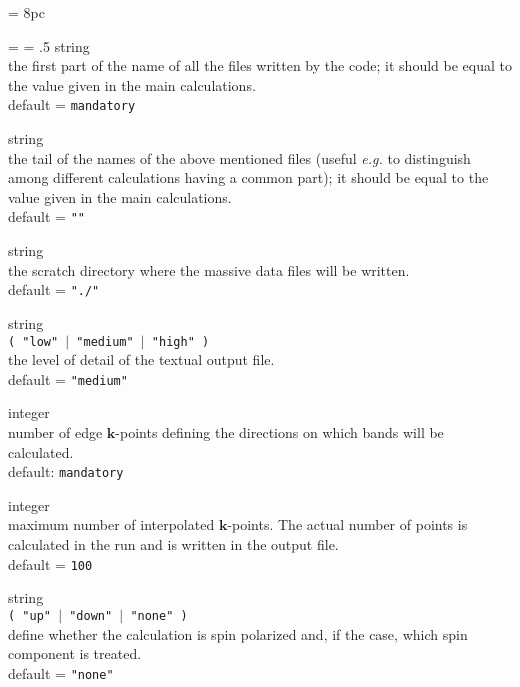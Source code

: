 \newdimen\descindent \descindent = 8pc
{\noindent \leftskip = \descindent \parskip = .5\baselineskip
{}%
{\sc string} \\ the first part of the name of all the files written by the code;
              it should be equal to the value given in the main calculations.\\
{\sc default} = {\tt mandatory} \par

\noindent{}%
{\sc string} \\ the tail of the names of the above mentioned files (useful
    {\it e.g.} to distinguish among different calculations having a common part);
    it should be equal to the value given in the main calculations.\\
    {\sc default} = {\tt ""} \par

\noindent{}%
{\sc string} \\ the scratch directory where the massive data files will be written.\\
              {\sc default} = {\tt "./"} \par

\noindent{}%
{\sc string} \\ {\tt ( "low" $\mid$ "medium" $\mid$ "high" ) }\\
              the level of detail of the textual output file.\\
              {\sc default} =  {\tt "medium"} \par

\noindent{}%
{\sc integer} \\ number of edge $\mathbf{k}$-points defining the directions
on which bands will be calculated.\\
{\sc default}: {\tt mandatory} \par

\noindent{}%
{\sc integer} \\ maximum number of interpolated $\mathbf{k}$-points. The actual number
of points is calculated in the run and is written in the output file.\\
{\sc default} = {\tt 100} \par

\noindent{}%
{\sc string} \\  {\tt ( "up" $\mid$ "down" $\mid$ "none" ) }\\
              define whether the calculation is spin polarized and, if the case,
              which spin component is treated.\\
{\sc default} = {\tt "none"} \par
}\bigskip

